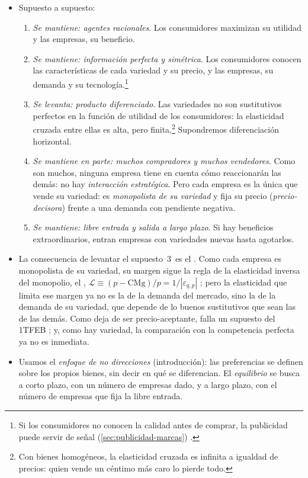 \documentclass[11pt]{article}
\begin{document}
\begin{itemize}
\item Supuesto a supuesto:
  \begin{enumerate}
  \item \emph{Se mantiene: agentes racionales}. Los consumidores maximizan su utilidad y las empresas, su beneficio.
  \item \emph{Se mantiene: información perfecta y simétrica}. Los consumidores conocen las características de cada variedad y su precio, y las empresas, su demanda y su tecnología.\footnote{Si los consumidores no conocen la calidad antes de comprar, la publicidad puede servir de señal (\ref{sec:publicidad-marcas}) .}
  \item \emph{Se levanta: producto diferenciado}. Las variedades no son sustitutivos perfectos en la función de utilidad de los consumidores: la elasticidad cruzada entre ellas es alta, pero finita.\footnote{Con bienes homogéneos, la elasticidad cruzada es infinita a igualdad de precios: quien vende un céntimo más caro lo pierde todo.} Supondremos diferenciación horizontal.
  \item \emph{Se mantiene en parte: muchos compradores y muchos vendedores}. Como son muchos, ninguna empresa tiene en cuenta cómo reaccionarán las demás: no hay \emph{interacción estratégica}. Pero cada empresa es la única que vende su variedad: es \emph{monopolista de su variedad} y fija su precio (\emph{precio-decisora}) frente a una demanda con pendiente negativa.
  \item \emph{Se mantiene: libre entrada y salida a largo plazo}. Si hay beneficios extraordinarios, entran empresas con variedades nuevas hasta agotarlos.
  \end{enumerate}
\item La consecuencia de levantar el supuesto~3~es el . Como cada empresa es monopolista de su variedad, su margen sigue la regla de la elasticidad inversa del monopolio, el , $\mathcal{L}\equiv(p-\mathrm{CMg})/p=1/|\varepsilon_{q,p}|$ ; pero la elasticidad que limita ese margen ya no es la de la demanda del mercado, sino la de la demanda de su variedad, que depende de lo buenos sustitutivos que sean las de las demás. Como deja de ser precio-aceptante, falla un supuesto del 1TFEB ; y, como hay variedad, la comparación con la competencia perfecta ya no es inmediata.
\item Usamos el \emph{enfoque de no direcciones} (introducción): las preferencias se definen sobre los propios bienes, sin decir en qué se diferencian. El \emph{equilibrio} se busca a corto plazo, con un número de empresas dado, y a largo plazo, con el número de empresas que fija la libre entrada.

\end{itemize}
\end{document}
